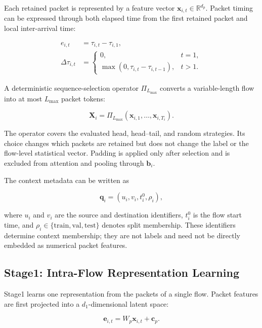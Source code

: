 Each retained packet is represented by a feature vector
$\mathbf{x}_{i,t}\in\mathbb{R}^{d_p}$. Packet timing can be expressed through
both elapsed time from the first retained packet and local inter-arrival time:

\begin{align}
e_{i,t} &= \tau_{i,t}-\tau_{i,1}, \\
\Delta\tau_{i,t} &=
\begin{cases}
0, & t=1,\\
\max(0,\tau_{i,t}-\tau_{i,t-1}), & t>1.
\end{cases}
\end{align}

A deterministic sequence-selection operator $\Pi_{L_{\max}}$ converts a
variable-length flow into at most $L_{\max}$ packet tokens:

\begin{equation}
\mathbf{X}_i=
\Pi_{L_{\max}}
\left(
    \mathbf{x}_{i,1},\ldots,\mathbf{x}_{i,T_i}
\right).
\end{equation}

The operator covers the evaluated head, head--tail, and random strategies. Its
choice changes which packets are retained but does not change the label or the
flow-level statistical vector. Padding is applied only after selection and is
excluded from attention and pooling through $\mathbf{b}_i$.

The context metadata can be written as

\begin{equation}
\mathbf{q}_i=(u_i,v_i,t_i^{0},\rho_i),
\end{equation}

where $u_i$ and $v_i$ are the source and destination identifiers, $t_i^{0}$ is
the flow start time, and $\rho_i\in\{\mathrm{train},\mathrm{val},\mathrm{test}\}$
denotes split membership. These identifiers determine context membership; they
are not labels and need not be directly embedded as numerical packet features.

\subsection{Stage1: Intra-Flow Representation Learning}
\label{subsec:stage1_formulation}

Stage1 learns one representation from the packets of a single flow. Packet
features are first projected into a $d_1$-dimensional latent space:

\begin{equation}
\mathbf{e}_{i,t}=W_p\mathbf{x}_{i,t}+\mathbf{c}_p.
\end{equation}

